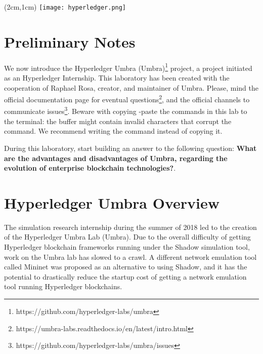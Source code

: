 \documentclass[12pt,a4paper]{article}
\theoremstyle{definition}
\begin{document}
\textblockorigin{-34pt}{-12pt}
\begin{textblock*}{10cm}(2cm,1cm)
\texttt{[image: hyperledger.png]}
\end{textblock*}
\newtheorem{mydef}{Definition}

\section*{Preliminary Notes}
We now introduce the Hyperledger Umbra (Umbra)\footnote{https://github.com/hyperledger-labs/umbra} project, a project initiated as an Hyperledger Internship. This laboratory has been created with the cooperation of Raphael Rosa, creator, and maintainer of Umbra. Please, mind the official documentation page for eventual questions\footnote{https://umbra-labs.readthedocs.io/en/latest/intro.html}, and the official channels to communicate issues\footnote{https://github.com/hyperledger-labs/umbra/issues}. Beware with copying -paste the commands in this lab to the terminal: the buffer might contain invalid characters that corrupt the command. We recommend writing the command instead of copying it.

During this laboratory, start building an answer to the following question: \textbf{What are the advantages and disadvantages of Umbra, regarding the evolution of enterprise blockchain technologies?}.



\section{Hyperledger Umbra Overview}
The simulation research internship during the summer of 2018 led to the creation of the Hyperledger Umbra Lab (Umbra). Due to the overall difficulty of getting Hyperledger blockchain frameworks running under the Shadow simulation tool, work on the Umbra lab has slowed to a crawl. A different network emulation tool called Mininet was proposed as an alternative to using Shadow, and it has the potential to drastically reduce the startup cost of getting a network emulation tool running Hyperledger blockchains.
\end{document}
